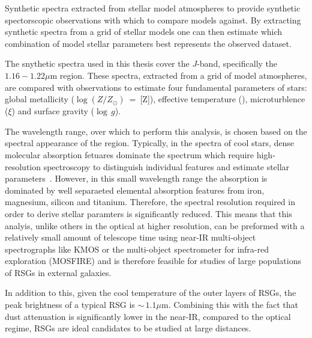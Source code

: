 Synthetic spectra extracted from stellar model atmospheres to provide synthetic spectorscopic observations with which to compare models against.
By extracting synthetic spectra from a grid of stellar models one can then estimate which combination of model stellar parameters best represents the observed dataset.

The snythetic spectra used in this thesis cover the $J$-band, specifically the $1.16-1.22\mu$m region.
These spectra, extracted from a grid of model atmospheres, are compared with observations to estimate four fundamental parameters of stars:
global metallicity ($\log (Z/Z_{\odot})$~=~[Z]), effective temperature (\Teff), microturblence ($\xi$) and surface gravity ($\log\,g$).


The wavelength range, over which to perform this analysis,
is chosen based on the spectral appearance of the region.
Typically, in the spectra of cool stars, dense molecular absorption fetuares dominate the spectrum which require high-resolution spectroscopy to distinguish individual features and estimate stellar parameters~\citep{Cunha07, Davies09a, Davies09b}.
However, in this small wavelength range the absorption is dominated by well separaeted elemental absorption features from iron, magnesium, silicon and titanium.
Therefore, the spectral resolution required in order to derive stellar paramters is significantly reduced.
This means that this analyis, unlike others in the optical at higher resolution, can be preformed with a relatively small amount of telescope time using near-IR multi-object spectrographs like KMOS
or the multi-object spectrometer for infra-red exploration (MOSFIRE) and is therefore feasible for studies of large populations of RSGs in external galaxies.

In addition to this, given the cool temperature of the outer layers of RSGs,
the peak brightness of a typical RSG is $\sim\,1.1\mu$m.
Combining this with the fact that dust attenuation is significantly lower in the near-IR, compared to the optical regime, RSGs are ideal candidates to be studied at large distances.


